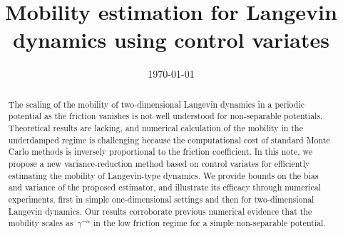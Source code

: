 \documentclass[11pt,a4paper]{article}
\date{\today}
\title{Mobility estimation for Langevin dynamics using control variates}
\author{%
}
\theoremstyle{plain}
\numberwithin{equation}{section}
\begin{document}
\maketitle

\begin{abstract}
    The scaling of the mobility of two-dimensional Langevin dynamics in a periodic potential as the friction vanishes is not well understood for non-separable potentials.
    Theoretical results are lacking,
    and numerical calculation of the mobility in the underdamped regime is challenging because
    the computational cost of standard Monte Carlo methods is inversely proportional to the friction coefficient.
    In this note, we propose a new variance-reduction method based on control variates for efficiently estimating the mobility of Langevin-type dynamics.
    We provide bounds on the bias and variance of the proposed estimator,
    and illustrate its efficacy through numerical experiments,
    first in simple one-dimensional settings
    and then for two-dimensional Langevin dynamics.
    Our results corroborate previous numerical evidence that
    the mobility scales as~$\gamma^{-\alpha}$ in the low friction regime for a simple non-separable potential.
\end{abstract}
\end{document}
